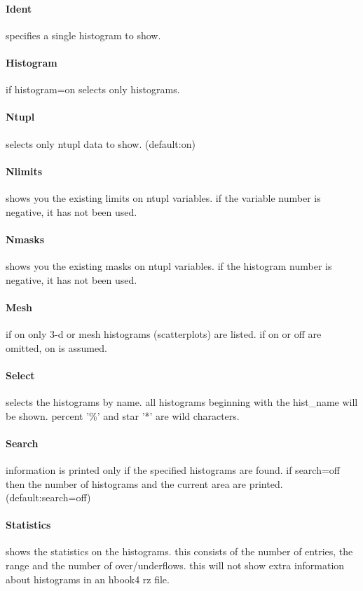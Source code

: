 \paragraph{Ident}
specifies a single histogram to show.  
\paragraph{Histogram}
if histogram=on selects only histograms.  
\paragraph{Ntupl}
selects only ntupl data to show.  
(default:on) 
\paragraph{Nlimits}
shows  you  the  existing limits on ntupl variables.  if the variable
number is negative, it has not been used.  
\paragraph{Nmasks}
shows  you  the  existing masks on ntupl variables.  if the histogram
number is negative, it has not been used.  
\paragraph{Mesh}
if  on  only 3-d or mesh histograms (scatterplots) are listed.  if on
or off are omitted, on is assumed.  
\paragraph{Select}
selects  the  histograms  by name.  all histograms beginning with the
hist\_name  will  be  shown.   percent  '\%'  and  star  '*'  are  wild
characters.  
\paragraph{Search}
information  is  printed  only if the specified histograms are found.
if search=off then the number of histograms and the current area  are
printed.  (default:search=off) 
\paragraph{Statistics}
shows  the statistics on the histograms.  this consists of the number
of entries, the range and the number of over/underflows.   this  will
not show extra information about histograms in an hbook4 rz file.  
